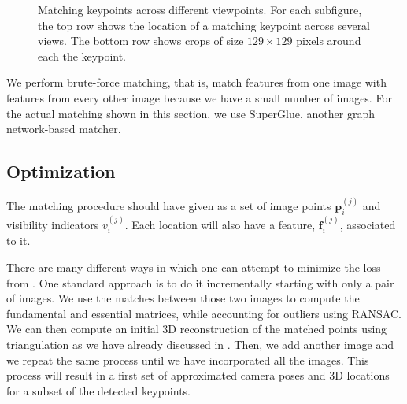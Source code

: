 \begin{figure}
\caption{Matching keypoints across different viewpoints. For each subfigure, the top row shows the location of a matching keypoint across several views. The bottom row shows crops of size $129 \times 129$ pixels around each the keypoint.}
\label{fig:sfm:palma_keypoint_matching_figure}
\end{figure}








We perform brute-force matching, that is, match features from one image with features from every other image because we have a small number of images.
For the actual matching shown in this section, we use SuperGlue, another graph network-based matcher. 

\subsection{Optimization}

The matching procedure should have given as a set of image points $\mathbf{p}^{(j)}_i$ and visibility indicators $v_i^{(j)}$. Each location will also have a feature, $\mathbf{f}^{(j)}_i$, associated to it. 

There are many different ways in which one can attempt to minimize the loss from \eqn{\ref{eq:final_reprojection_error}}. One standard approach is to do it incrementally starting with only a pair of images. We use the matches between those two images to compute the fundamental and essential matrices, while accounting for outliers using RANSAC. We can then compute an initial 3D reconstruction of the matched points using triangulation as we have already discussed in \chap{\ref{chap:stereo_vision}}. Then, we add another image and we repeat the same process until we have incorporated all the images.  This process will result in a first set of approximated camera poses and 3D locations for a subset of the detected keypoints. 


